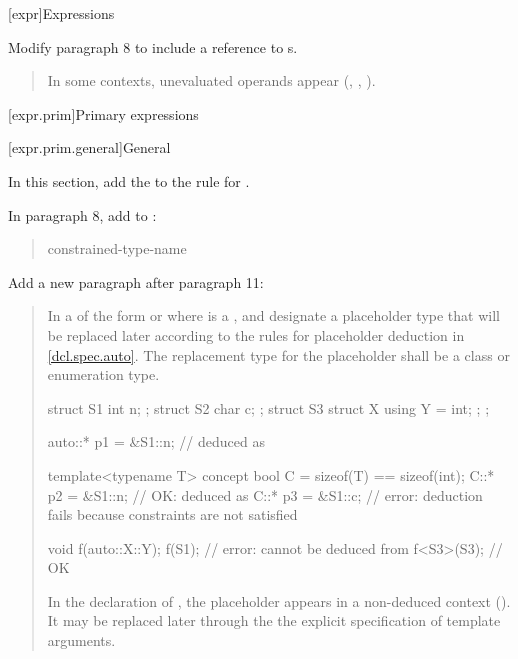 

\setcounter{chapter}{4}
[expr]{Expressions}

Modify paragraph 8 to include a reference to s.

\begin{quote}
\pnum
In some contexts, unevaluated operands appear
(\added{\ref{expr.prim.req}, }, , 
).
\end{quote}

[expr.prim]{Primary expressions}

[expr.prim.general]{General}

In this section, add the
 to the rule for 
.

\begin{quote}
\begin{bnf}
\br
\end{bnf}
\end{quote}

In paragraph 8, add  to :

\begin{quote}
\setcounter{Paras}{7}
\pnum
\begin{bnf}
\br
     \terminal{::}\br
    constrained-type-name \terminal{::}
\end{bnf}
\end{quote}

Add a new paragraph after paragraph 11:

\begin{quote}
\setcounter{Paras}{11}
\pnum
In a  of the form  or
 where  is a ,
 and  designate a placeholder type that will be
replaced later according to the rules for placeholder deduction in
\ref{dcl.spec.auto}.
%
The replacement type for the placeholder shall be a class or enumeration type.
\enterexample
\begin{codeblock}
struct S1 { int n; };
struct S2 { char c; };
struct S3 { struct X { using Y = int; }; };

auto::* p1 = &S1::n; //  deduced as 

template<typename T> concept bool C = sizeof(T) == sizeof(int);
C::* p2 = &S1::n; // OK:  deduced as 
C::* p3 = &S1::c; // error: deduction fails because constraints are not satisfied

void f(auto::X::Y);
f(S1);       // error:  cannot be deduced from 
f<S3>(S3{}); // OK
\end{codeblock}
In the declaration of , the placeholder appears in a non-deduced 
context (). It may be replaced later through the
the explicit specification of template arguments.
\exitexample
\end{quote}

